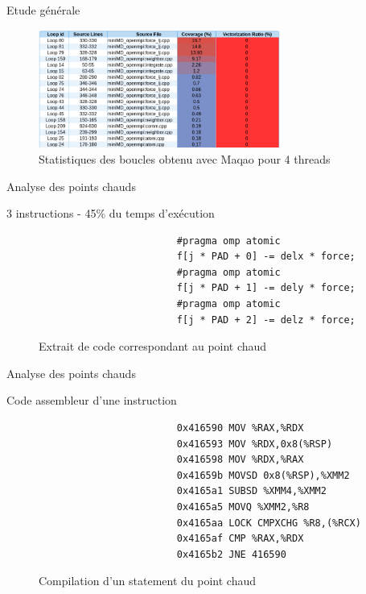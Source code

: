\documentclass[9.5pt]{beamer}
\begin{document}
		\begin{frame}{Etude générale}
			
			\begin{figure}[h!]
				\centering
				\begin{center}
					\includegraphics[width=300px]{images/maqao_loops.png}
					\caption{Statistiques des boucles obtenu avec Maqao pour 4 threads}
					\label{loop_maqao}
				\end{center}
			\end{figure}
		\end{frame}

		\begin{frame}[fragile]{Analyse des points chauds}
			\begin{block}{3 instructions - 45\% du temps d'exécution}
				\begin{figure}[h!]
					\begin{verbatim}
						#pragma omp atomic
						f[j * PAD + 0] -= delx * force;
						#pragma omp atomic
						f[j * PAD + 1] -= dely * force;
						#pragma omp atomic
						f[j * PAD + 2] -= delz * force;
					\end{verbatim}
					\centering
					\caption{Extrait de code correspondant au point chaud}
					\label{code:hotspot}
				\end{figure}
			\end{block}
\end{frame}

		\begin{frame}[fragile]{Analyse des points chauds}
			\begin{block}{Code assembleur d'une instruction}
				\begin{figure}[h!]
					\begin{verbatim}
						0x416590 MOV %RAX,%RDX
						0x416593 MOV %RDX,0x8(%RSP)
						0x416598 MOV %RDX,%RAX
						0x41659b MOVSD 0x8(%RSP),%XMM2
						0x4165a1 SUBSD %XMM4,%XMM2
						0x4165a5 MOVQ %XMM2,%R8
						0x4165aa LOCK CMPXCHG %R8,(%RCX)
						0x4165af CMP %RAX,%RDX
						0x4165b2 JNE 416590
					\end{verbatim}
					\centering
					\caption{Compilation d'un statement du point chaud}
					\label{code:hotspot}
				\end{figure}
			\end{block}
\end{frame}
\end{document}
